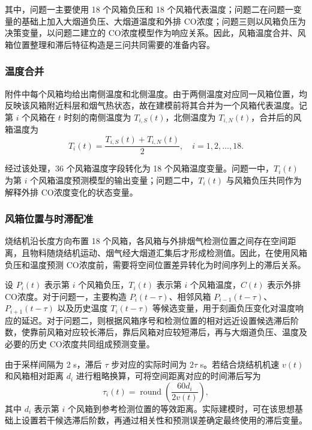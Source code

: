 \documentclass[UTF8,a4paper,zihao=-4]{ctexart}
\newcommand{\CO}{CO}
\begin{document}
其中，问题一主要使用 18 个风箱负压和 18 个风箱代表温度；问题二在问题一变量的基础上加入大烟道负压、大烟道温度和外排 \CO 浓度；问题三则以风箱负压为决策变量，以问题二建立的 \CO 浓度模型作为响应关系。因此，风箱温度合并、风箱位置整理和滞后特征构造是三问共同需要的准备内容。

\subsubsection{温度合并}

附件中每个风箱均给出南侧温度和北侧温度。由于两侧温度对应同一风箱位置，均反映该风箱附近料层和烟气热状态，故在建模前将其合并为一个风箱代表温度。记第 $i$ 个风箱在 $t$ 时刻的南侧温度为 $T_{i,S}(t)$，北侧温度为 $T_{i,N}(t)$，合并后的风箱温度为
\begin{equation}
T_i(t)=\frac{T_{i,S}(t)+T_{i,N}(t)}{2},\quad i=1,2,\ldots,18.
\end{equation}

经过该处理，36 个风箱温度字段转化为 18 个风箱温度变量。问题一中，$T_i(t)$ 为第 $i$ 个风箱温度预测模型的输出变量；问题二中，$T_i(t)$ 与风箱负压共同作为解释外排 \CO 浓度变化的状态变量。

\subsubsection{风箱位置与时滞配准}

烧结机沿长度方向布置 18 个风箱，各风箱与外排烟气检测位置之间存在空间距离，且物料随烧结机运动、烟气经大烟道汇集后才形成检测值。因此，在使用风箱负压和温度预测 \CO 浓度前，需要将空间位置差异转化为时间序列上的滞后关系。

设 $P_i(t)$ 表示第 $i$ 个风箱负压，$T_i(t)$ 表示第 $i$ 个风箱温度，$C(t)$ 表示外排 \CO 浓度。对于问题一，主要构造 $P_i(t-\tau)$、相邻风箱 $P_{i-1}(t-\tau)$、$P_{i+1}(t-\tau)$ 以及历史温度 $T_i(t-\tau)$ 等候选变量，用于刻画负压变化对温度响应的延迟。对于问题二，则根据风箱序号和检测位置的相对远近设置候选滞后阶数，使靠前风箱对应较长滞后，靠后风箱对应较短滞后，再与大烟道负压、温度及必要的历史 \CO 浓度共同组成预测变量。

由于采样间隔为 2 s，滞后 $\tau$ 步对应的实际时间为 $2\tau$ s。若结合烧结机机速 $v(t)$ 和风箱相对距离 $d_i$ 进行粗略换算，可将空间距离对应的时间滞后写为
\begin{equation}
\tau_i(t)=\operatorname{round}\left(\frac{60d_i}{2v(t)}\right),
\end{equation}
其中 $d_i$ 表示第 $i$ 个风箱到参考检测位置的等效距离。实际建模时，可在该思想基础上设置若干候选滞后阶数，再通过相关性和预测误差确定最终使用的滞后变量。
\end{document}
